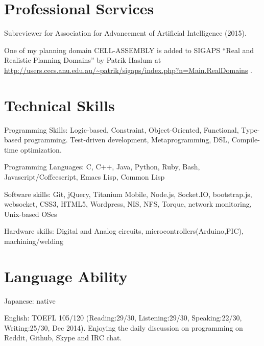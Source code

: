 \documentclass[letterpaper]{article}
\begin{document}
\renewcommand{\refname}{Publications}

\let\uline\relax
\nocite{Asai2014}
\nocite{Asai2014b}
\nocite{Asai2015}




\section{Professional Services}

Subreviewer for Association for Advancement of Artificial Intelligence (2015).

One of my planning domain CELL-ASSEMBLY is added to SIGAPS ``Real and
Realistic Planning Domains'' by Patrik Haslum at
\url{http://users.cecs.anu.edu.au/~patrik/sigaps/index.php?n=Main.RealDomains}
.

\section{Technical Skills}

\begin{CV}
 \item[Programming Skills:] Logic-based, Constraint, Object-Oriented,
 Functional, Type-based programming. Test-driven development, Metaprogramming, DSL, Compile-time optimization.
 \item[Programming Languages:] C, C++, Java, Python, Ruby, Bash,
 Javascript/Coffeescript, Emacs Lisp, Common Lisp
 \item[Software skills:] Git, jQuery, Titanium Mobile,
 Node.js, Socket.IO, bootstrap.js, websocket, CSS3, HTML5, Wordpress, NIS, NFS,
 Torque, network monitoring, Unix-based OSes
 \item[Hardware skills:] Digital and Analog circuits, microcontrollers(Arduino,PIC), machining/welding
\end{CV}

\section{Language Ability}

\begin{CV}
 \item[Japanese:] native
 \item[English:] TOEFL 105/120 (Reading:29/30, Listening:29/30,
 Speaking:22/30, Writing:25/30, Dec 2014). Enjoying the daily discussion
 on programming on Reddit, Github, Skype and IRC chat.
\end{CV}
\end{document}
